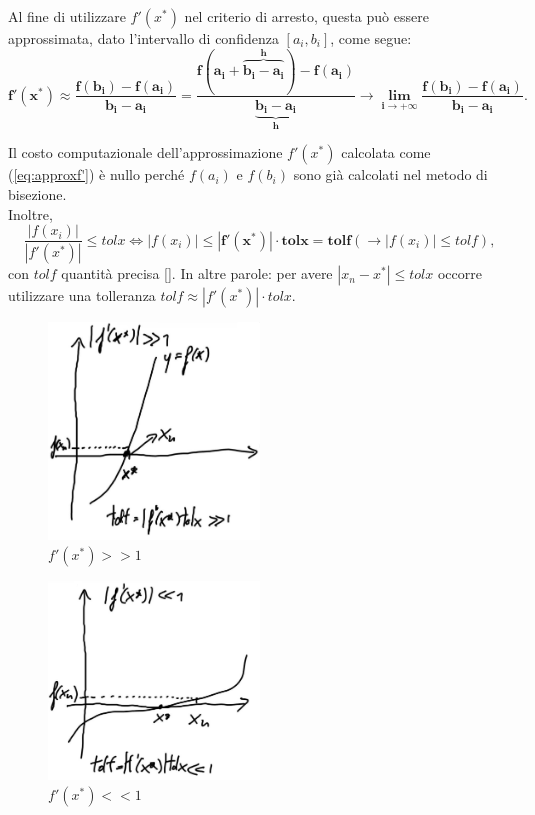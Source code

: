 Al fine di utilizzare $f'(x^*)$ nel criterio di arresto, questa può essere approssimata, dato l'intervallo di confidenza $[a_i, b_i]$, come segue:
\begin{equation}\label{eq:approxf'}
	\boldsymbol{f'(x^*)\approx\frac{f(b_i)-f(a_i)}{b_i-a_i}=\frac{f(a_i+\overbrace{b_i-a_i}^{h})-f(a_i)}{\underbrace{b_i-a_i}_{h}}\rightarrow \lim_{i\to + \infty}\frac{f(b_i)-f(a_i)}{b_i-a_i}}.
\end{equation}

\begin{remark}
	Il costo computazionale dell'approssimazione $f'(x^*)$ calcolata come (\ref{eq:approxf'}) è nullo perché $f(a_i)$ e $f(b_i)$ sono già calcolati nel metodo di bisezione.\\
	Inoltre,
	\begin{equation*}
		\frac{|f(x_i)|}{|f'(x^*)|}\leq tolx \iff |f(x_i)|\leq \boldsymbol{|f'(x^*)|\cdot tolx=tolf}(\rightarrow |f(x_i)|\leq tolf),
	\end{equation*}
	con ${tolf}$ quantità precisa [\footnotemark]. In altre parole: per avere $|x_n-x^*|\leq tolx$ occorre utilizzare una tolleranza $tolf\approx|f'(x^*)|\cdot tolx$.
\end{remark}

\begin{figure}
	\centering
	\includegraphics[width=0.5\textwidth]{immagini/f1(xStar)major1.jpg}
	\caption{\label{fig:f1(xStar)major1.jpg}$f'(x^*)>>1$}
\end{figure}
\begin{figure}
	\centering
	\includegraphics[width=0.5\textwidth]{immagini/f1(xStar)minor1.jpg}
	\caption{\label{fig:f1(xStar)minor1.jpg} $f'(x^*)<<1$}
\end{figure}

